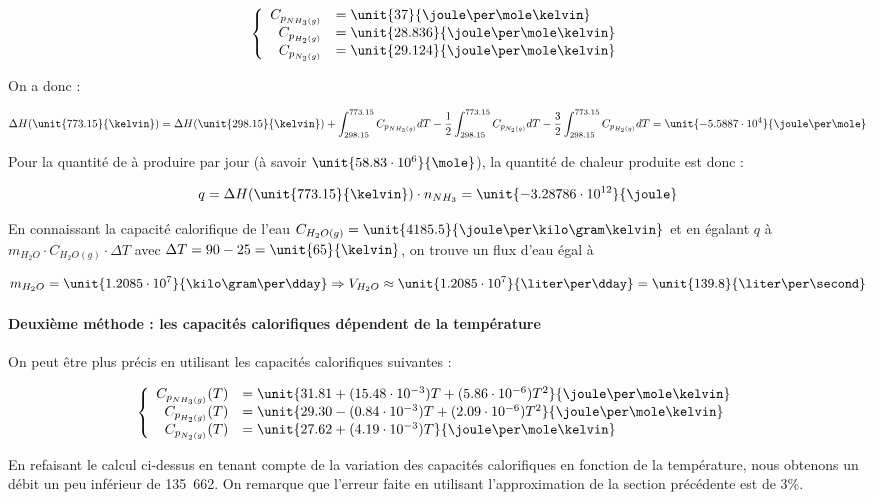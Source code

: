 	$$
	\left\{
		\begin{array}{rl}
			C_{p_{NH_3(g)}} &= \unit{37}{\joule\per\mole\kelvin}\\
			C_{p_{H_2(g)}} 	&= \unit{28.836}{\joule\per\mole\kelvin}\\
			C_{p_{N_2(g)}} 	&= \unit{29.124}{\joule\per\mole\kelvin}
		\end{array}
	\right.
	$$

On a donc :

$$\Delta H(\unit{773.15}{\kelvin}) = \Delta H(\unit{298.15}{\kelvin})
+ \int_{298.15}^{773.15} C_{p_{NH_3(g)}} dT - \frac{1}{2}\int_{298.15}^{773.15} C_{p_{N_2(g)}} dT
- \frac{3}{2} \int_{298.15}^{773.15} C_{p_{H_2(g)}} dT = \unit{-5.5887 \cdot 10^4}{\joule\per\mole}$$

Pour la quantité de  à produire par jour 
(à savoir $\unit{58.83 \cdot 10^6}{\mole}$),
la quantité de chaleur produite est donc :

$$q = \Delta H(\unit{773.15}{\kelvin}) \cdot n_{NH_3} = \unit{-3.28786 \cdot 10^{12}}{\joule}$$

En connaissant la capacité calorifique de l'eau $C_{H_2O(g)} =
\unit{4185.5}{\joule\per\kilo\gram\kelvin}$ \cite{atkins}et en égalant
$q$ à $m_{H_2O} \cdot C_{H_2O(g)} \cdot \Delta T$ avec 
$\Delta T = 90 - 25 = \unit{65}{\kelvin}$, on trouve un
flux d'eau égal à

$$m_{H_2O} = \unit{1.2085 \cdot 10^7}{\kilo\gram\per\dday} \Rightarrow V_{H_2O} \approx \unit{1.2085 \cdot 10^7}{\liter\per\dday} 
= \unit{139.8}{\liter\per\second}$$

\paragraph{Deuxième méthode : les capacités calorifiques dépendent de la température}
On peut être plus précis en utilisant les capacités calorifiques suivantes \cite{hc-table} :

	$$
	\left\{
		\begin{array}{rl}
			C_{p_{NH_3(g)}}(T) &= \unit{31.81 + (15.48 \cdot 10^{-3})T + (5.86 \cdot 10^{-6})T^2}{\joule\per\mole\kelvin}\\
			C_{p_{H_2(g)}}(T) 	&= \unit{29.30 - (0.84 \cdot 10^{-3})T + (2.09 \cdot 10^{-6})T^2}{\joule\per\mole\kelvin}\\
			C_{p_{N_2(g)}}(T) 	&= \unit{27.62 + (4.19 \cdot 10^{-3})T}{\joule\per\mole\kelvin}
		\end{array}
	\right.
	$$

En refaisant le calcul ci-dessus en tenant compte de la variation des capacités
calorifiques en fonction
de la température, nous obtenons un débit un peu inférieur 
de \unit{135.662}{\liter\per\second}. On remarque
que l'erreur faite en utilisant l'approximation de la section
précédente est de 3\%.


